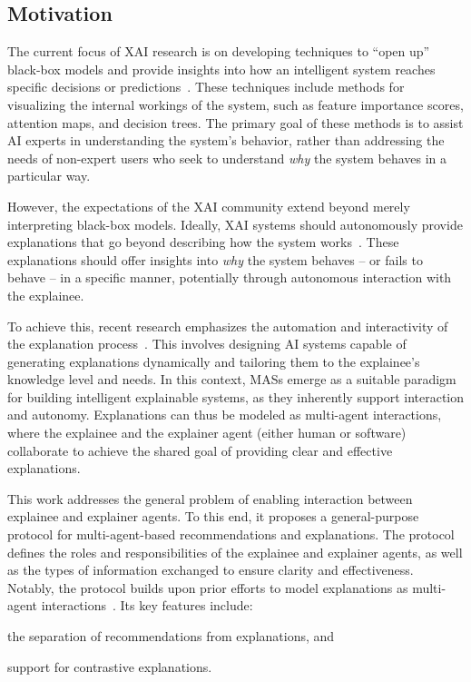 \subsection{Motivation}\label{subsec:introduction-general-purpose-protocol-for-multi-agent-based-explanations}
%
The current focus of \gls{XAI} research is on developing techniques to ``open up'' black-box models and provide insights into how an intelligent system reaches specific decisions or predictions~\cite{DBLP:journals/csur/GuidottiMRTGP19}.
%
These techniques include methods for visualizing the internal workings of the system, such as feature importance scores, attention maps, and decision trees.
%
The primary goal of these methods is to assist \gls{AI} experts in understanding the system's behavior, rather than addressing the needs of non-expert users who seek to understand \emph{why} the system behaves in a particular way.

However, the expectations of the \gls{XAI} community extend beyond merely interpreting black-box models.
%
Ideally, \gls{XAI} systems should autonomously provide explanations that go beyond describing how the system works~\cite{DBLP:conf/aiia/CiattoCOC19}.
%
These explanations should offer insights into \emph{why} the system behaves -- or fails to behave -- in a specific manner, potentially through autonomous interaction with the explainee.

To achieve this, recent research emphasizes the automation and interactivity of the explanation process~\cite{DBLP:conf/atal/CiattoSOC20}.
%
This involves designing \gls{AI} systems capable of generating explanations dynamically and tailoring them to the explainee's knowledge level and needs.
%
In this context, \glspl{MAS} emerge as a suitable paradigm for building intelligent explainable systems, as they inherently support interaction and autonomy.
%
Explanations can thus be modeled as multi-agent interactions, where the explainee and the explainer agent (either human or software) collaborate to achieve the shared goal of providing clear and effective explanations.

This work addresses the general problem of enabling interaction between explainee and explainer agents.
%
To this end, it proposes a general-purpose protocol for multi-agent-based recommendations and explanations.
%
The protocol defines the roles and responsibilities of the explainee and explainer agents, as well as the types of information exchanged to ensure clarity and effectiveness.
%
Notably, the protocol builds upon prior efforts to model explanations as multi-agent interactions~\cite{buzcu-prima-2022}.
%
Its key features include:
%
\begin{inlinelist}
    \item the separation of recommendations from explanations, and
    \item support for contrastive explanations.
\end{inlinelist}

